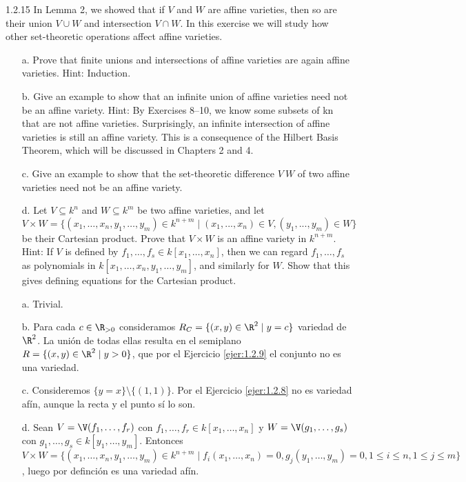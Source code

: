 \documentclass[twoside]{article}
\begin{document}
\begin{ejercicio}{1.2.15}
In Lemma 2, we showed that if $V$ and $W$ are affine varieties, then so are their union $V∪W$
and intersection $V ∩W$. In this exercise we will study how other set-theoretic operations
affect affine varieties.
\begin{itemize}
\item[a.] Prove that finite unions and intersections of affine varieties are again affine varieties.
Hint: Induction.
\item[b.] Give an example to show that an infinite union of affine varieties need not be an
affine variety. Hint: By Exercises 8–10, we know some subsets of kn that are not
affine varieties. Surprisingly, an infinite intersection of affine varieties is still an affine
variety. This is a consequence of the Hilbert Basis Theorem, which will be discussed
in Chapters 2 and 4.
\item[c.] Give an example to show that the set-theoretic difference $V \ W$ of two affine varieties
need not be an affine variety.
\item[d.] Let $V ⊆ k^n$ and $W ⊆ k^m$ be two affine varieties, and let
$$V × W = \{(x_1,\dots , x_n, y_1,\dots , y_m) ∈ k^{n+m} \mid  (x_1, . . . , x_n) ∈ V, (y_1, . . . , y_m) ∈ W\}$$
be their Cartesian product. Prove that $V ×W$ is an affine variety in $k^{n+m}$. Hint: If $V$ is
defined by $f_1,\dots , f_s ∈ k[x_1,\dots , x_n]$, then we can regard $f_1,\dots, f_s$ as polynomials in
$k[x_1,\dots , x_n, y_1,\dots, y_m]$, and similarly for $W$. Show that this gives defining equations
for the Cartesian product.
\end{itemize}
\end{ejercicio}
\begin{solucion}
\begin{itemize}
\item[]
\item[a.] Trivial.
\item[b.] Para cada $c\in \R_{>0}$ consideramos $R_C=\{(x,y)\in\R^2 \mid y=c\}$ variedad de $\R^2$. La unión de todas ellas resulta en el semiplano $R =\{(x,y)\in\R^2 \mid y>0\}$, que por el Ejercicio \ref{ejer:1.2.9} el conjunto no es una variedad.
\item[c.] Consideremos $\{y=x\}\setminus \{(1,1)\}$. Por el Ejercicio \ref{ejer:1.2.8} no es variedad afín, aunque la recta y el punto sí lo son.
\item[d.] Sean $V=\V(f_1,\dots, f_r)$ con $f_1,\dots, f_r\in k[x_1,\dots, x_n]$ y $W=\V(g_1,\dots, g_s)$ con $g_1,\dots, g_s\in k[y_1,\dots, y_m]$. Entonces $V\times W=\{(x_1,\dots, x_n,y_1,\dots, y_m)\in k^{n+m}\mid f_i(x_1,\dots, x_n)=0, g_j(y_1,\dots, y_m)=0, 1\leq i\leq n, 1\leq j\leq m\}$, luego por definción es una variedad afín.
\end{itemize}
\end{solucion}
\end{document}
